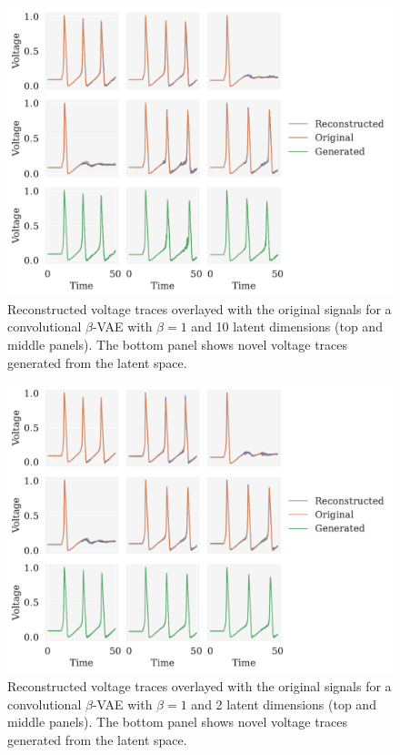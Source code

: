 \begin{figure}[!htb]
\begin{center}\includegraphics[scale=0.75]{latex/figures/hh_conv_vae_beta_1_z_10.pdf}
\end{center}
\caption{Reconstructed voltage traces overlayed with the original signals for a convolutional $\beta$-VAE with $\beta=1$ and 10 latent dimensions (top and middle panels). The bottom panel shows novel voltage traces generated from the latent space.}
\label{fig:hh_conv_vae_beta_1_z_10}
\end{figure}

\begin{figure}[!htb]
\begin{center}\includegraphics[scale=0.75]{latex/figures/hh_conv_vae_beta_1_z_2.pdf}
\end{center}
\caption{Reconstructed voltage traces overlayed with the original signals for a convolutional $\beta$-VAE with $\beta=1$ and 2 latent dimensions (top and middle panels). The bottom panel shows novel voltage traces generated from the latent space.}
\label{fig:hh_conv_vae_beta_1_z_2}
\end{figure}


\FloatBarrier
